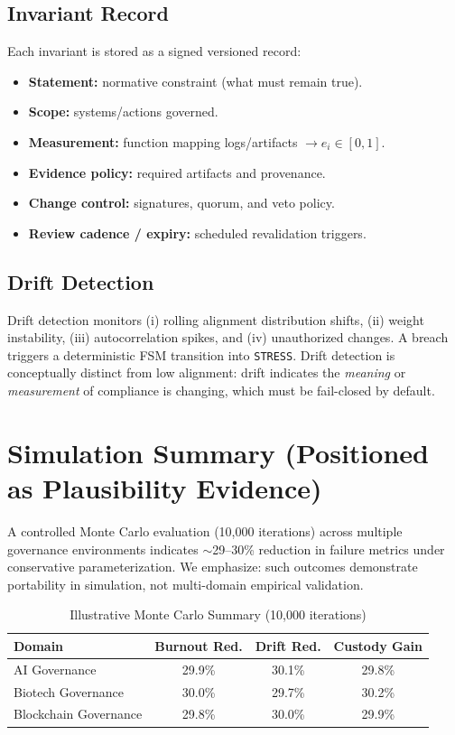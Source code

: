 \documentclass[conference]{IEEEtran}
\begin{document}
\subsection{Invariant Record}
Each invariant is stored as a signed versioned record:
\begin{itemize}
\item \textbf{Statement:} normative constraint (what must remain true).
\item \textbf{Scope:} systems/actions governed.
\item \textbf{Measurement:} function mapping logs/artifacts $\rightarrow e_i \in [0,1]$.
\item \textbf{Evidence policy:} required artifacts and provenance.
\item \textbf{Change control:} signatures, quorum, and veto policy.
\item \textbf{Review cadence / expiry:} scheduled revalidation triggers.
\end{itemize}

\subsection{Drift Detection}
Drift detection monitors (i) rolling alignment distribution shifts, (ii) weight instability, (iii) autocorrelation spikes, and (iv) unauthorized changes.
A breach triggers a deterministic FSM transition into \texttt{STRESS}.
Drift detection is conceptually distinct from low alignment: drift indicates the \emph{meaning} or \emph{measurement} of compliance is changing, which must be fail-closed by default.

\section{Simulation Summary (Positioned as Plausibility Evidence)}
A controlled Monte Carlo evaluation (10,000 iterations) across multiple governance environments indicates $\sim$29--30\% reduction in failure metrics under conservative parameterization.
We emphasize: such outcomes demonstrate portability in simulation, not multi-domain empirical validation.

\begin{table}[t]
\caption{Illustrative Monte Carlo Summary (10,000 iterations)}
\label{tab:mc}
\centering
\begin{tabular}{lccc}
\toprule
Domain & Burnout Red. & Drift Red. & Custody Gain \\
\midrule
AI Governance & 29.9\% & 30.1\% & 29.8\% \\
Biotech Governance & 30.0\% & 29.7\% & 30.2\% \\
Blockchain Governance & 29.8\% & 30.0\% & 29.9\% \\
\bottomrule
\end{tabular}
\end{table}
\end{document}
